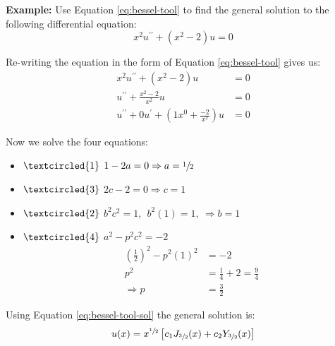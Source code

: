 \noindent\textbf{Example:}  Use Equation \ref{eq:bessel-tool} to find the general solution to the following differential equation:
\begin{equation*}
x^2 u^{\prime \prime} + \left(x^2 - 2\right)u = 0
\end{equation*}

Re-writing the equation in the form of Equation \ref{eq:bessel-tool} gives us:
\begin{align*}
x^2 u^{\prime \prime} + \left(x^2 - 2\right)u &= 0 \\
u^{\prime \prime} + \frac{x^2-2}{x^2}u &= 0 \\
u^{\prime \prime} + 0u^{\prime} + \left(1x^0 + \frac{-2}{x^2} \right)u &= 0
\end{align*}

Now we solve the four equations:
\begin{itemize}
\item $\textcircled{1}$  $1-2a = 0 \Rightarrow a = \sfrac{1}{2}$
\item $\textcircled{3}$ $2c-2=0 \Rightarrow c = 1$
\item $\textcircled{2}$ $b^2c^2=1, \ \ b^2(1) = 1, \ \Rightarrow b=1$
\item $\textcircled{4}$ $a^2 - p^2c^2=-2$ 
\begin{align*}
\left(\frac{1}{2} \right)^2 - p^2(1)^2 &=-2 \\
p^2 &= \frac{1}{4} + 2 = \frac{9}{4} \\
\Rightarrow p &= \frac{3}{2}
\end{align*}
\end{itemize}
Using Equation \ref{eq:bessel-tool-sol} the general solution is:
\begin{equation*}
u(x) = x^{\sfrac{1}{2}}\left[c_1 J_{\sfrac{3}{2}}(x) + c_2 Y_{\sfrac{3}{2}}(x) \right]
\end{equation*}


